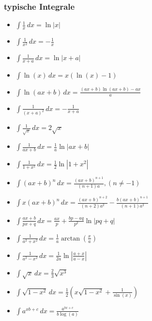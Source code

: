 \subsubsection{typische Integrale}
\begin{itemize}[leftmargin=*]
  	\item $\int \frac{1}{x} \,dx = \ln |x|$
	\item $\int \frac{1}{x^2} \,dx = -\frac{1}{x}$
  	\item $\int \frac{1}{x+a} \,dx = \ln |x+a|$
  	\item $\int \ln(x) \,dx = x(\ln(x) - 1)$
  	\item $\int \ln(ax + b) \,dx = \frac{(a x+b) \ln (a x+b)-a x}{a}$
  	\item $\int \frac{1}{(x+a)^2} \,dx = - \frac{1}{x+a}$
  	\item $\int \frac{1}{\sqrt{x}} \,dx = 2 \sqrt{x}$
	\item $\int \frac{1}{ax+b} \,dx = \frac{1}{a} \ln |ax+b|$
	\item $\int \frac{1}{1 + x^2} \,dx = \frac{1}{2} \ln |1 + x^2|$
	\item $\int(ax + b)^n \,dx = \frac{(ax + b)^{n+1}}{(n + 1)a}, (n \neq -1)$
	\item $\int x(ax+b)^n \,dx = \frac{(ax + b)^{n+2}}{(n+2)a^2} -
	\frac{b(ax+b)^{n+1}}{(n+1)a^2}$
	\item $\int \frac{ax + b}{px + q} \,dx = \frac{ax}{p} + \frac{bp - aq}{p^2} \ln
	|pq+q|$
	\item $\int \frac{1}{a^2 + x^2} \,dx = \frac{1}{a} \arctan(\frac{x}{a})$
	\item $\int \frac{1}{a^2 - x^2} \,dx = \frac{1}{2a} \ln \left | \frac{a+x}{a-x}
	\right |$
	\item $\int \sqrt{x} \,dx = \frac{2}{3}\sqrt{x^3}$
	\item $\int \sqrt{1-x^2} \,dx = \frac{1}{2}\left( x\sqrt{1-x^2}+\frac{1}{\sin(x)} \right)$
	\item $\int a^{xb + c} \,dx = \frac{a^{bx + c}}{b \log(a)}$
\end{itemize}


